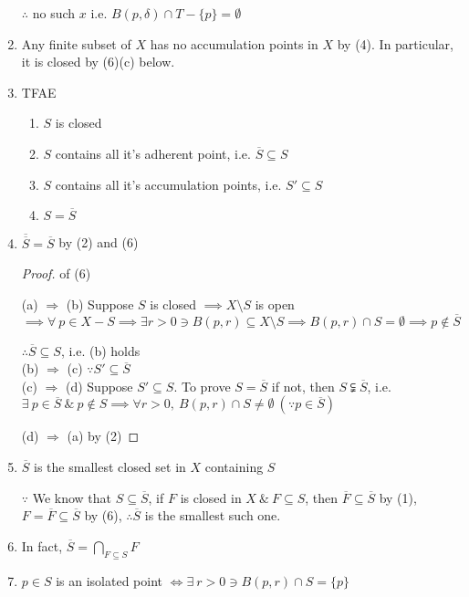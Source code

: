 \begin{enumerate}[wide,label=\textbf{(\arabic*)}]
	$\therefore$ no such $x$ i.e. $B(p,\delta) \cap T - \{p\} = \emptyset$
	\item Any finite subset of $X$ has no accumulation points in $X$ by (4). In particular, it is closed by (6)(c) below.
	\item TFAE
	\begin{enumerate}
		\item $S$ is closed
		\item $S$ contains all it's adherent point, i.e. $\overline{S} \subseteq S$
		\item $S$ contains all it's accumulation points, i.e. $S' \subseteq S$
		\item $S = \overline{S}$
	\end{enumerate}
	\item $\overline{\overline{S}} = \overline{S}$ by (2) and (6)
	\begin{proof} of (6)

(a) $\Rightarrow$ (b) Suppose $S$ is closed $\implies X \setminus S$ is open $\implies \forall ~ p \in X - S \implies \exists r > 0 \ni B(p,r) \subseteq X \setminus S \implies B(p,r) \cap S = \emptyset \implies p \notin \overline{S}$

$\therefore \overline{S} \subseteq S$, i.e. (b) holds\\

(b) $\Rightarrow$ (c) $\because S' \subseteq \overline{S}$\\

(c) $\Rightarrow$ (d) Suppose $S' \subseteq S$. To prove $S = \overline{S}$ if not, then $S \subsetneqq \overline{S}$, i.e. $\exists~ p \in \overline{S} ~\&~ p\notin S \implies \forall r > 0,~B(p,r) \cap S \neq \emptyset~(\because p \in \overline{S})$

(d) $\Rightarrow$ (a) by (2)


\end{proof}

	\item $\overline{S}$ is the smallest closed set in $X$ containing $S$
	
	$\because$ We know that $S \subseteq \overline{S}$, if $F$ is closed in $X ~\&~ F \subseteq S$, then $\overline{F} \subseteq \overline{S}$ by (1), $F = \overline{F} \subseteq \overline{S}$ by (6), $\therefore \overline{S}$ is the smallest such one.
	\item In fact, $\overline{S} = \bigcap_{F \subseteq S}F$
	\item $p \in S$ is an isolated point $\Leftrightarrow \exists~ r > 0 \ni B(p,r) \cap S = \{p\}$
	

\end{enumerate}
